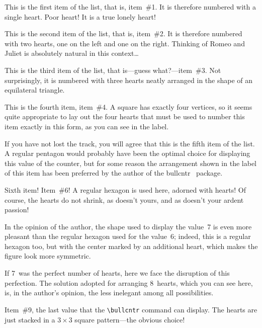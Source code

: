 \documentclass[a4paper]{article}
\DeclareRobustCommand*{\packlass}[1]{%
	{\texorpdfstring{\normalfont \sffamily}{}#1}%
}
\newcommand*{\Bullcntr}{bullcntr}
\newcommand*{\bull}{\packlass{\Bullcntr}}
\newcommand*{\tbull}{the \bull\ package}
\begin{document}
\begin{bullenum}
	\heartctrbull

	\item\label{Hearts-1}
		This is the first item of the list, that is, item~\#1.  It is
		therefore numbered with a single heart.  Poor heart!  It is a
		true lonely heart!

	\item
		This is the second item of the list, that is, item~\#2.  It is
		therefore numbered with two hearts, one on the left and one on
		the right.  Thinking of Romeo and Juliet is absolutely natural
		in this context\ldots

	\item\label{Hearts-3}
		This is the third item of the list, that is---guess
		what?---item~\#3.  Not surprisingly, it is numbered with three
		hearts neatly arranged in the shape of an equilateral
		triangle.

	\item\label{Hearts-4}
		This is the fourth item, item~\#4.  A square has exactly four
		vertices, so it seems quite appropriate to lay out the four
		hearts that must be used to number this item exactly in this
		form, as you can see in the label.

	\item\label{Hearts-5}
		If you have not lost the track, you will agree that this is
		the fifth item of the list.  A regular pentagon would probably
		have been the optimal choice for displaying this value of the
		counter, but for some reason the arrangement shown in the
		label of this item has been preferred by the author of \tbull.

	\item
		Sixth item!  Item~\#6!  A regular hexagon is used here,
		adorned with hearts!  Of course, the hearts do not shrink, as
		doesn't yours, and as doesn't your ardent passion!

	\item\label{Hearts-7}
		In the opinion of the author, the shape used to display the
		value~7 is even more pleasant than the regular hexagon used
		for the value~6; indeed, this is a regular hexagon too, but
		with the center marked by an additional heart, which makes the
		figure look more symmetric.

	\item\label{Hearts-8}
		If 7~was the perfect number of hearts, here we face the
		disruption of this perfection.  The solution adopted for
		arranging 8~hearts, which you can see here, is, in the
		author's opinion, the less inelegant among all possibilities.

	\item
		Item~\#9, the last value that the \verb|\bullcntr| command can
		display.  The hearts are just stacked in a $3\times3$ square
		pattern---the obvious choice!
\end{bullenum}
\end{document}
